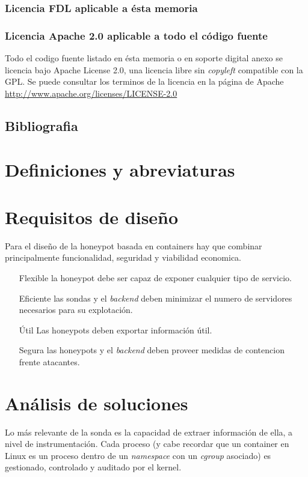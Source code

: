 \subsubsection{Licencia FDL aplicable a ésta memoria}

\subsubsection{Licencia Apache 2.0 aplicable a todo el código fuente}
Todo el codigo fuente listado en ésta memoria o en soporte digital anexo se licencia bajo Apache License 2.0, una licencia libre sin \emph{copyleft} compatible con la GPL.
Se puede consultar los terminos de la licencia en la página de Apache \url{http://www.apache.org/licenses/LICENSE-2.0}

\subsection{Bibliografia}
\printbibliography[title={Referencias},heading=none]
\nopagebreak
\section{Definiciones y abreviaturas}
\section{Requisitos de diseño}

Para el diseño de la honeypot basada en containers hay que combinar principalmente funcionalidad, seguridad y viabilidad economica.

\begin{enumerate}
    \item[Flexible] la honeypot debe ser capaz de exponer cualquier tipo de servicio.
    \item[Eficiente] las sondas y el \emph{backend} deben minimizar el numero de servidores necesarios para su explotación.
    \item[Útil] Las honeypots deben exportar información útil.
    \item[Segura] las honeypots y el \emph{backend} deben proveer medidas de contencion frente atacantes.  
\end{enumerate}


\section{Análisis de soluciones}

Lo más relevante de la sonda es la capacidad de extraer información de ella, a nivel de instrumentación. Cada proceso (y cabe recordar que un container en Linux es un proceso dentro de un \emph{namespace} con un \emph{cgroup} asociado) es gestionado, controlado
y auditado por el kernel.

